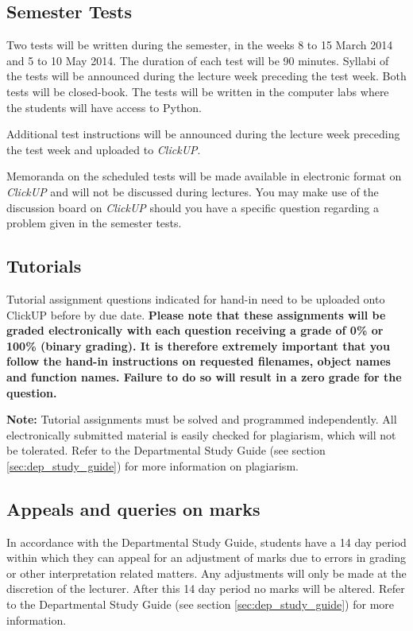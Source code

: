     \subsection{Semester Tests}
        Two tests will be written during the semester, in the weeks 8 to 15
        March 2014 and 5 to 10 May 2014. The duration of each test will be
        90 minutes. Syllabi of the tests will be announced during the lecture
        week preceding the test week. Both tests will be closed-book. The
        tests will be written in the computer labs where the students will
        have access to Python.

        Additional test instructions will be announced during the lecture
        week preceding the test week and uploaded to {\it ClickUP}.

        Memoranda on the scheduled tests will be made available in electronic
        format on {\it ClickUP} and will not be discussed during lectures. You may
        make use of the discussion board on {\it ClickUP} should you have a specific
        question regarding a problem given in the semester tests.

    \subsection{Tutorials}
        Tutorial assignment questions indicated for hand-in need to be
        uploaded onto ClickUP before by due date. \textbf{Please note that
        these assignments will be graded electronically with each
        question receiving a grade of 0\% or 100\% (binary grading). It
        is therefore extremely important that you follow the hand-in
        instructions on requested filenames, object names and function
        names. Failure to do so will result in a zero grade for the
        question.}

        \textbf{Note:} Tutorial assignments must be solved and
        programmed independently. All electronically submitted
        material is easily checked for plagiarism, which will not be
        tolerated. Refer to the Departmental Study Guide (see section
        \ref{sec:dep_study_guide}) for more information on plagiarism.

    \subsection{Appeals and queries on marks}
        In accordance with the Departmental Study Guide, students have a 14
        day period within which they can appeal for an adjustment of marks
        due to errors in grading or other interpretation related matters.
        Any adjustments will only be made at the discretion of the lecturer.
        After this 14 day period no marks will be altered. Refer to the
        Departmental Study Guide (see section \ref{sec:dep_study_guide})
        for more information.

